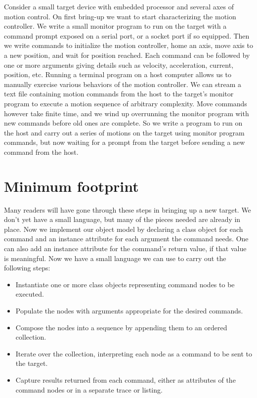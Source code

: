 \documentclass[a4paper,10pt]{article}
\begin{document}
Consider a small target device with embedded processor and several axes of motion control. On first bring-up we want to start characterizing the motion controller. We write a small monitor program to run on the target with a command prompt exposed on a serial port, or a socket port if so equipped. Then we write commands to initialize the motion controller, home an axis, move axis to a new position, and wait for position reached. Each command can be followed by one or more arguments giving details such as velocity, acceleration, current, position, etc. Running a terminal program on a host computer allows us to manually exercise various behaviors of the motion controller. We can stream a text file containing motion commands from the host to the target's monitor program to execute a motion sequence of arbitrary complexity. Move commands however take finite time, and we wind up overrunning the monitor program with new commands before old ones are complete. So we write a program to run on the host and carry out a series of motions on the target using monitor program commands, but now waiting for a prompt from the target before sending a new command from the host.

\section{Minimum footprint}

Many readers will have gone through these steps in bringing up a new target. We don't yet have a small language, but many of the pieces needed are already in place. Now we implement our object model by declaring a class object for each command and an instance attribute for each argument the command needs. One can also add an instance attribute for the command's return value, if that value is meaningful. Now we have a small language we can use to carry out the following steps:

\begin{itemize}
 \item Instantiate one or more class objects representing command nodes to be executed.
 \item Populate the nodes with arguments appropriate for the desired commands.
 \item Compose the nodes into a sequence by appending them to an ordered collection.
 \item Iterate over the collection, interpreting each node as a command to be sent to the target.
 \item Capture results returned from each command, either as attributes of the command nodes or in a separate trace or listing.
\end{itemize}
\end{document}
